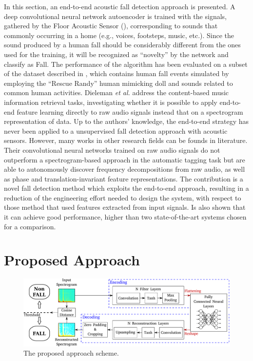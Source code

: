 In this section, an end-to-end acoustic fall detection approach is presented. A deep convolutional neural network autoencoder is trained with the signals, gathered by the Floor Acoustic Sensor (), corresponding to sounds that commonly occurring in a home (e.g., voices, footsteps, music, etc.). Since the sound produced by a human fall should be considerably different from the ones used for the training, it will be recognized as ``novelty'' by the network and classify as Fall. 
The performance of the algorithm has been evaluated on a subset of the dataset described in , which contains human fall events simulated by employing the “Rescue Randy” human mimicking doll \cite{Werner2011,zigel2009method,alwan2006smart} and sounds related to common human activities.
Dieleman \textit{et al.} \cite{dieleman2014end} address the content-based music information retrieval tasks, investigating whether it is possible to apply end-to-end feature learning directly to raw audio signals instead that on a spectrogram representation of data.   
Up to the authors' knowledge, the end-to-end strategy has never been applied to a unsupervised fall detection approach with acoustic sensors. However, many works in other research fields can be founds in literature. 
Their convolutional neural networks trained on raw audio signals do not outperform a spectrogram-based approach in the automatic tagging task but are able to autonomously discover frequency decompositions from raw audio, as well as phase and translation-invariant feature representations.
The contribution is a novel fall detection method which exploits the end-to-end approach, resulting in a reduction of the engineering effort needed to design the system, with respect to those method that used features extracted from input signals. Is also shown that it can achieve good performance, higher than two state-of-the-art systems chosen for a comparison.


\section{Proposed Approach}
\label{sec:proposedApproach}

\begin{figure}[htb]
	\centering
	\includegraphics[width=\columnwidth]{img/wirn2017/approccioComplessivo.pdf}
	\caption{The proposed approach scheme.}\label{fig:overall}
\end{figure}


